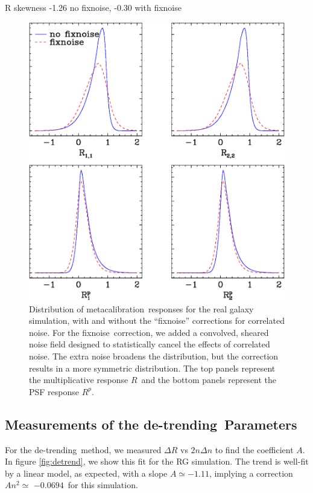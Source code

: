 \documentclass[usegraphicx,usenatbib]{mn2e}
\newcommand{\mcal}{metacalibration}
\newcommand{\mcalR}{$R$}
\newcommand{\mcalRpsf}{$R^{p}$}
\newcommand{\detrend}{de-trending}
\newcommand{\fixnoise}{fixnoise}
\newcommand{\Aslope}{$-1.11$}
\newcommand{\Rcorr}{$-0.0694$}
\begin{document}
R skewness -1.26 no fixnoise,  -0.30 with fixnoise

\begin{figure}
    \centering
    \includegraphics[scale=0.45]{mcal-v14s01-v14s02-compare-R.eps}

    \caption{Distribution of \mcal\ responses for the real galaxy
    simulation, with and without the ``\fixnoise'' corrections
    for correlated noise.  For the \fixnoise\ correction, we
    added a convolved, sheared noise field designed to statistically
    cancel the effects of correlated noise.  The extra noise
    broadens the distribution, but the correction results in a more symmetric
    distribution.  The top panels represent the multiplicative
    response \mcalR\ and the bottom panels represent the PSF response \mcalRpsf.} 

\label{fig:Rdist}
\end{figure}


\subsection{Measurements of the \detrend\ Parameters}

For the \detrend\ method, we measured $\Delta R$ vs $2 n \Delta n$ to find the
coefficient $A$.  In figure \ref{fig:detrend}, we show this fit for the RG
simulation.  The trend is well-fit by a linear model, as expected, with a slope
$A \simeq $\Aslope, implying a correction $A n^2 \simeq$ \Rcorr\ for this
simulation.
\end{document}
